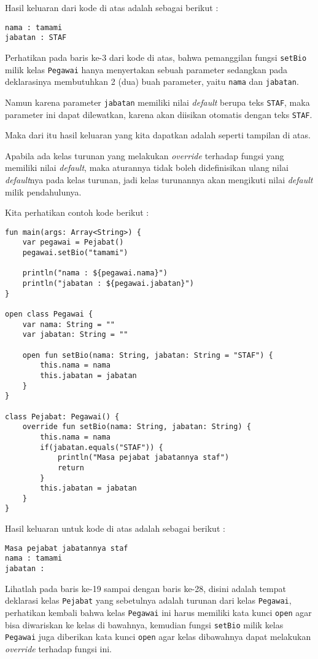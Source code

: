 Hasil keluaran dari kode di atas adalah sebagai berikut :

\begin{lstlisting}
nama : tamami
jabatan : STAF
\end{lstlisting}

Perhatikan pada baris ke-3 dari kode di atas, bahwa pemanggilan fungsi \texttt{setBio} milik kelas \texttt{Pegawai} hanya menyertakan sebuah parameter sedangkan pada deklarasinya membutuhkan 2 (dua) buah parameter, yaitu \texttt{nama} dan \texttt{jabatan}. 

Namun karena parameter \texttt{jabatan} memiliki nilai \textit{default} berupa teks \texttt{STAF}, maka parameter ini dapat dilewatkan, karena akan diisikan otomatis dengan teks \texttt{STAF}.

Maka dari itu hasil keluaran yang kita dapatkan adalah seperti tampilan di atas.

Apabila ada kelas turunan yang melakukan \textit{override} terhadap fungsi yang memiliki nilai \textit{default}, maka aturannya tidak boleh didefinisikan ulang nilai \textit{default}nya pada kelas turunan, jadi kelas turunannya akan mengikuti nilai \textit{default} milik pendahulunya.

Kita perhatikan contoh kode berikut :

\begin{lstlisting}
fun main(args: Array<String>) {
	var pegawai = Pejabat()
	pegawai.setBio("tamami")
	
	println("nama : ${pegawai.nama}")
	println("jabatan : ${pegawai.jabatan}")
}

open class Pegawai {
	var nama: String = ""
	var jabatan: String = ""
	
	open fun setBio(nama: String, jabatan: String = "STAF") {
		this.nama = nama
		this.jabatan = jabatan
	}
}

class Pejabat: Pegawai() {
	override fun setBio(nama: String, jabatan: String) {
		this.nama = nama
		if(jabatan.equals("STAF")) {
			println("Masa pejabat jabatannya staf")
			return
		}
		this.jabatan = jabatan
	}
}
\end{lstlisting}

Hasil keluaran untuk kode di atas adalah sebagai berikut :

\begin{lstlisting}
Masa pejabat jabatannya staf
nama : tamami
jabatan :
\end{lstlisting}

Lihatlah pada baris ke-19 sampai dengan baris ke-28, disini adalah tempat deklarasi kelas \texttt{Pejabat} yang sebetulnya adalah turunan dari kelas \texttt{Pegawai}, perhatikan kembali bahwa kelas \texttt{Pegawai} ini harus memiliki kata kunci \texttt{open} agar bisa diwariskan ke kelas di bawahnya, kemudian fungsi \texttt{setBio} milik kelas \texttt{Pegawai} juga diberikan kata kunci \texttt{open} agar kelas dibawahnya dapat melakukan \textit{override} terhadap fungsi ini.

